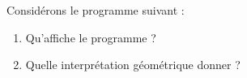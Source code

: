 
\begin{exercice}\label{exoSeconde-0083}

    Considérons le programme suivant :
    


\begin{enumerate}
    \item
        Qu'affiche le programme ?
    \item
        Quelle interprétation géométrique donner ?
\end{enumerate}

\end{exercice}
